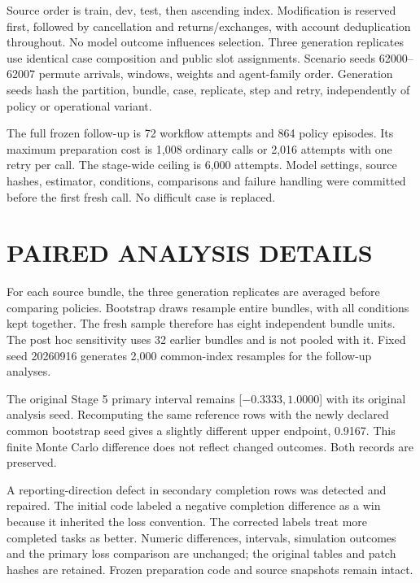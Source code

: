 Source order is train, dev, test, then ascending index. Modification is reserved first, followed by cancellation and returns/exchanges, with account deduplication throughout. No model outcome influences selection. Three generation replicates use identical case composition and public slot assignments. Scenario seeds 62000--62007 permute arrivals, windows, weights and agent-family order. Generation seeds hash the partition, bundle, case, replicate, step and retry, independently of policy or operational variant.



The full frozen follow-up is 72 workflow attempts and 864 policy episodes. Its maximum preparation cost is 1,008 ordinary calls or 2,016 attempts with one retry per call. The stage-wide ceiling is 6,000 attempts. Model settings, source hashes, estimator, conditions, comparisons and failure handling were committed before the first fresh call. No difficult case is replaced.



\section{PAIRED ANALYSIS DETAILS}
\noindent For each source bundle, the three generation replicates are averaged before comparing policies. Bootstrap draws resample entire bundles, with all conditions kept together. The fresh sample therefore has eight independent bundle units. The post hoc sensitivity uses 32 earlier bundles and is not pooled with it. Fixed seed 20260916 generates 2,000 common-index resamples for the follow-up analyses.\draftcredit

The original Stage 5 primary interval remains [$-0.3333,1.0000$] with its original analysis seed. Recomputing the same reference rows with the newly declared common bootstrap seed gives a slightly different upper endpoint, 0.9167. This finite Monte Carlo difference does not reflect changed outcomes. Both records are preserved.

A reporting-direction defect in secondary completion rows was detected and repaired. The initial code labeled a negative completion difference as a win because it inherited the loss convention. The corrected labels treat more completed tasks as better. Numeric differences, intervals, simulation outcomes and the primary loss comparison are unchanged; the original tables and patch hashes are retained. Frozen preparation code and source snapshots remain intact.

